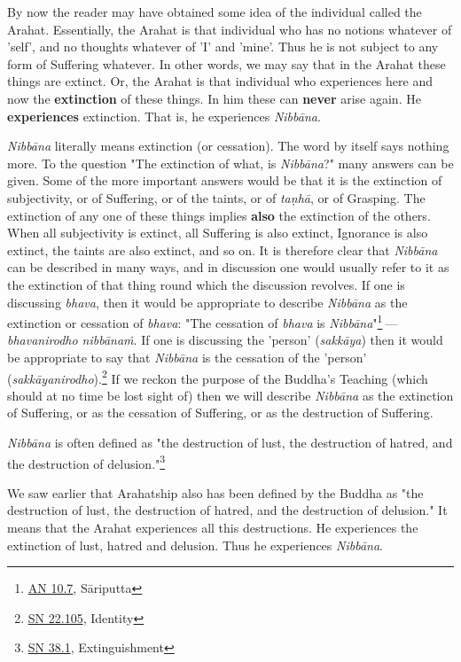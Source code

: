 By now the reader may have obtained some idea of the individual called
the Arahat. Essentially, the Arahat is that individual who has no
notions whatever of 'self', and no thoughts whatever of 'I' and 'mine'.
Thus he is not subject to any form of Suffering whatever. In other
words, we may say that in the Arahat these things are extinct. Or, the
Arahat is that individual who experiences here and now the \textbf{extinction}
of these things. In him these can \textbf{never} arise again. He \textbf{experiences}
extinction. That is, he experiences \emph{Nibbāna}.


\emph{Nibbāna} literally means extinction (or cessation). The word by itself
says nothing more. To the question "The extinction of what, is
\emph{Nibbāna}?" many answers can be given. Some of the more important
answers would be that it is the extinction of subjectivity, or of
Suffering, or of the taints, or of \emph{taṇhā}, or of Grasping. The
extinction of any one of these things implies \textbf{also} the extinction of
the others. When all subjectivity is extinct, all Suffering is also
extinct, Ignorance is also extinct, the taints are also extinct, and so
on. It is therefore clear that \emph{Nibbāna} can be described in many ways,
and in discussion one would usually refer to it as the extinction of
that thing round which the discussion revolves. If one is discussing
\emph{bhava}, then it would be appropriate to describe \emph{Nibbāna} as the
extinction or cessation of \emph{bhava}: "The cessation of \emph{bhava} is
\emph{Nibbāna}"\footnote{\href{https://suttacentral.net/an10.7/en/bodhi}{AN 10.7}, Sāriputta} — \emph{bhavanirodho nibbānaṁ}. If one is discussing the
'person' (\emph{sakkāya}) then it would be appropriate to say that \emph{Nibbāna}
is the cessation of the 'person' (\emph{sakkāyanirodho}).\footnote{\href{https://suttacentral.net/sn22.105/en/sujato}{SN 22.105}, Identity}
If we reckon the
purpose of the Buddha’s Teaching (which should at no time be lost sight
of) then we will describe \emph{Nibbāna} as the extinction of Suffering, or
as the cessation of Suffering, or as the destruction of Suffering.


\emph{Nibbāna} is often defined as "the destruction of lust, the destruction
of hatred, and the destruction of delusion."\footnote{\href{https://suttacentral.net/sn38.1/en/sujato}{SN 38.1}, Extinguishment}


We saw earlier that Arahatship also has been defined by the Buddha as
"the destruction of lust, the destruction of hatred, and the destruction
of delusion." It means that the Arahat experiences all this
destructions. He experiences the extinction of lust, hatred and
delusion. Thus he experiences \emph{Nibbāna}.


